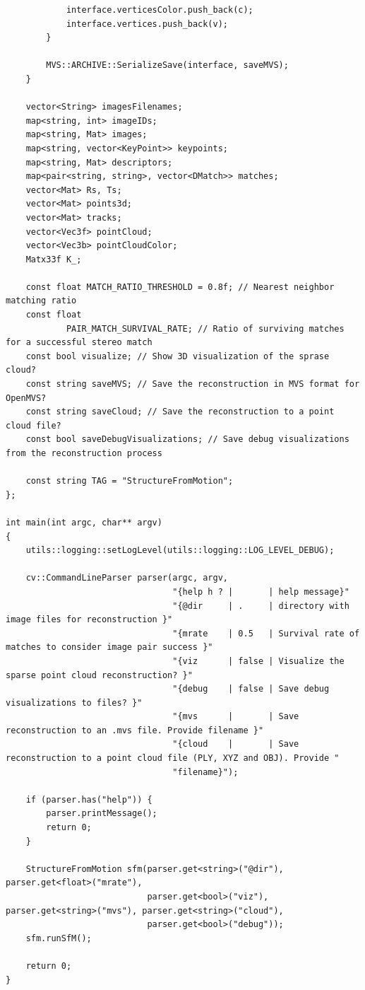 \documentclass[a4paper, 12pt]{article}
\begin{document}
\begin{lstlisting}
            interface.verticesColor.push_back(c);
            interface.vertices.push_back(v);
        }

        MVS::ARCHIVE::SerializeSave(interface, saveMVS);
    }

    vector<String> imagesFilenames;
    map<string, int> imageIDs;
    map<string, Mat> images;
    map<string, vector<KeyPoint>> keypoints;
    map<string, Mat> descriptors;
    map<pair<string, string>, vector<DMatch>> matches;
    vector<Mat> Rs, Ts;
    vector<Mat> points3d;
    vector<Mat> tracks;
    vector<Vec3f> pointCloud;
    vector<Vec3b> pointCloudColor;
    Matx33f K_;

    const float MATCH_RATIO_THRESHOLD = 0.8f; // Nearest neighbor matching ratio
    const float
            PAIR_MATCH_SURVIVAL_RATE; // Ratio of surviving matches for a successful stereo match
    const bool visualize; // Show 3D visualization of the sprase cloud?
    const string saveMVS; // Save the reconstruction in MVS format for OpenMVS?
    const string saveCloud; // Save the reconstruction to a point cloud file?
    const bool saveDebugVisualizations; // Save debug visualizations from the reconstruction process

    const string TAG = "StructureFromMotion";
};

int main(int argc, char** argv)
{
    utils::logging::setLogLevel(utils::logging::LOG_LEVEL_DEBUG);

    cv::CommandLineParser parser(argc, argv,
                                 "{help h ? |       | help message}"
                                 "{@dir     | .     | directory with image files for reconstruction }"
                                 "{mrate    | 0.5   | Survival rate of matches to consider image pair success }"
                                 "{viz      | false | Visualize the sparse point cloud reconstruction? }"
                                 "{debug    | false | Save debug visualizations to files? }"
                                 "{mvs      |       | Save reconstruction to an .mvs file. Provide filename }"
                                 "{cloud    |       | Save reconstruction to a point cloud file (PLY, XYZ and OBJ). Provide "
                                 "filename}");

    if (parser.has("help")) {
        parser.printMessage();
        return 0;
    }

    StructureFromMotion sfm(parser.get<string>("@dir"), parser.get<float>("mrate"),
                            parser.get<bool>("viz"), parser.get<string>("mvs"), parser.get<string>("cloud"),
                            parser.get<bool>("debug"));
    sfm.runSfM();

    return 0;
}

	\end{lstlisting}
\end{document}
